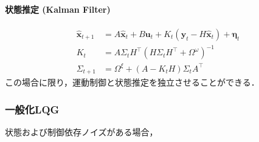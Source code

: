 \paragraph{状態推定 (Kalman Filter)}
\begin{align}
\widehat{\mathbf{x}}_{t+1}&=A \widehat{\mathbf{x}}_{t}+B \mathbf{u}_{t}+K_{t}\left(\mathbf{y}_{t}-H \widehat{\mathbf{x}}_{t}\right)+\boldsymbol{\eta}_{t} \\ 
K_{t}&=A \Sigma_{t} H^{\top}\left(H \Sigma_{t} H^{\top}+\Omega^{\omega}\right)^{-1} \\ 
\Sigma_{t+1}&=\Omega^{\xi}+\left(A-K_{t} H\right) \Sigma_{t} A^{\top}
\end{align}
この場合に限り，運動制御と状態推定を独立させることができる．
\subsubsection{一般化LQG}
状態および制御依存ノイズがある場合，
